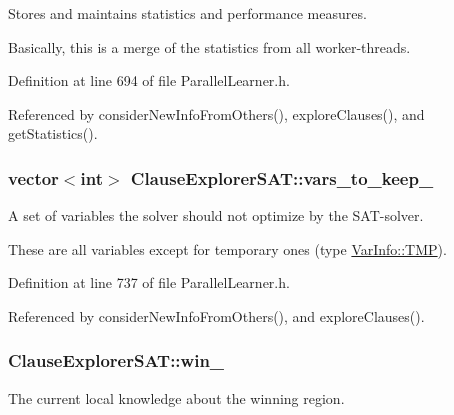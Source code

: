 Stores and maintains statistics and performance measures. 

Basically, this is a merge of the statistics from all worker-\/threads. 

Definition at line 694 of file Parallel\-Learner.\-h.



Referenced by consider\-New\-Info\-From\-Others(), explore\-Clauses(), and get\-Statistics().

\hypertarget{classClauseExplorerSAT_a9d9c6caf1a451ed22a096c2ef5e8bbc2}{
\subsubsection[{vars\-\_\-to\-\_\-keep\-\_\-}]{\setlength{\rightskip}{0pt plus 5cm}vector$<$int$>$ Clause\-Explorer\-S\-A\-T\-::vars\-\_\-to\-\_\-keep\-\_\-\hspace{0.3cm}{\ttfamily [protected]}}}\label{classClauseExplorerSAT_a9d9c6caf1a451ed22a096c2ef5e8bbc2}


A set of variables the solver should not optimize by the S\-A\-T-\/solver. 

These are all variables except for temporary ones (type \hyperlink{classVarInfo_a64d1da76cf84fe674e5fef9764ef11cfa84a2d8d86f004930fe564dc5b395b29f}{Var\-Info\-::\-T\-M\-P}). 

Definition at line 737 of file Parallel\-Learner.\-h.



Referenced by consider\-New\-Info\-From\-Others(), and explore\-Clauses().

\hypertarget{classClauseExplorerSAT_ac67574d6aba7936c410d4424d798efed}{
\subsubsection[{win\-\_\-}]{ Clause\-Explorer\-S\-A\-T\-::win\-\_\-\hspace{0.3cm}{\ttfamily [protected]}}}\label{classClauseExplorerSAT_ac67574d6aba7936c410d4424d798efed}


The current local knowledge about the winning region. 

